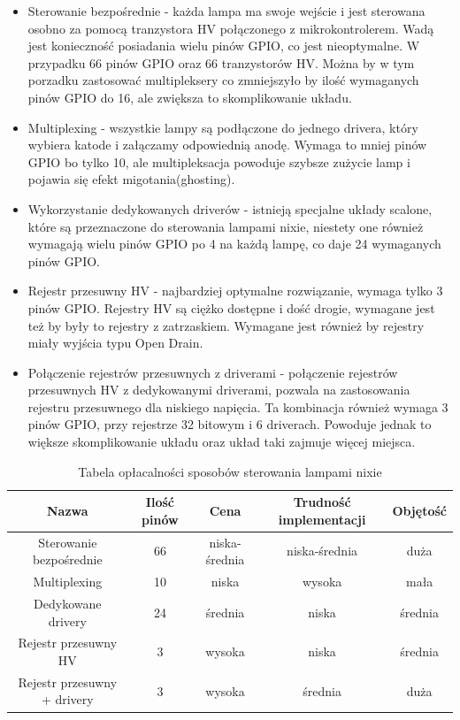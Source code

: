 \documentclass[../main.tex]{subfiles}
\begin{document}
\begin{itemize}
    \item Sterowanie bezpośrednie - każda lampa ma swoje wejście i jest sterowana osobno za pomocą tranzystora HV połączonego z mikrokontrolerem.
    Wadą jest konieczność posiadania wielu pinów GPIO, co jest nieoptymalne. W przypadku 66 pinów GPIO oraz 66 tranzystorów HV.
    Można by w tym porzadku zastosować multipleksery co zmniejszyło by ilość wymaganych pinów GPIO do 16, ale zwiększa to skomplikowanie układu.
    \item Multiplexing - wszystkie lampy są podłączone do jednego drivera, który wybiera katode i załączamy odpowiednią anodę. 
    Wymaga to mniej pinów GPIO bo tylko 10, ale multipleksacja powoduje szybsze zużycie lamp i pojawia się efekt migotania(ghosting).
    \item Wykorzystanie dedykowanych driverów - istnieją specjalne układy scalone, które są przeznaczone do sterowania lampami nixie, niestety
    one również wymagają wielu pinów GPIO po 4 na każdą lampę, co daje 24 wymaganych pinów GPIO.
    \item Rejestr przesuwny HV - najbardziej optymalne rozwiązanie, wymaga tylko 3 pinów GPIO. Rejestry HV są ciężko dostępne i dość drogie,
    wymagane jest też by były to rejestry z zatrzaskiem. Wymagane jest również by rejestry miały wyjścia typu Open Drain.
    \item Połączenie rejestrów przesuwnych z driverami - połączenie rejestrów przesuwnych HV z dedykowanymi driverami, pozwala na zastosowania
    rejestru przesuwnego dla niskiego napięcia. Ta kombinacja również wymaga 3 pinów GPIO, przy rejestrze 32 bitowym i 6 driverach. Powoduje jednak to
    większe skomplikowanie układu oraz układ taki zajmuje więcej miejsca.
\end{itemize}

\begin{table}[H]
  \centering
  \begin{tabular}{|c|c|c|c|c|}
    \hline
    Nazwa & Ilość pinów & Cena & Trudność implementacji & Objętość\\
    \hline
    Sterowanie bezpośrednie & 66 & niska-średnia & niska-średnia & duża \\
    \hline
    Multiplexing & 10 &niska & wysoka & mała \\
    \hline
    Dedykowane drivery & 24 &średnia & niska & średnia \\
    \hline
    Rejestr przesuwny HV & 3 &wysoka & niska & średnia \\
    \hline
    Rejestr przesuwny + drivery & 3 & wysoka & średnia & duża \\
    \hline
  \end{tabular}
  \caption{Tabela opłacalności sposobów sterowania lampami nixie}
\end{table}
\end{document}
